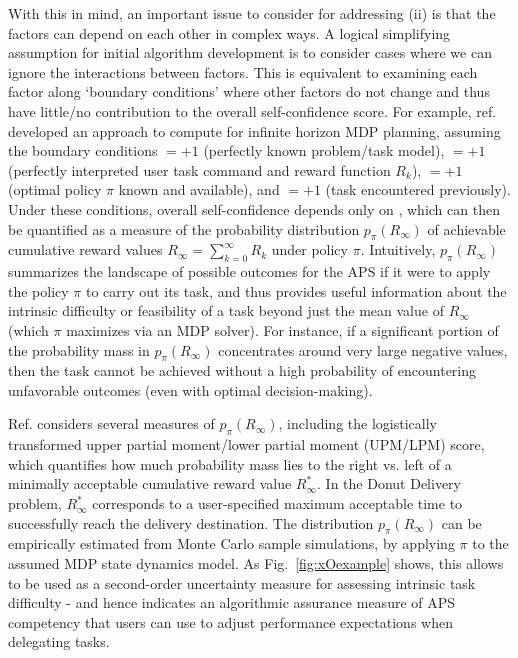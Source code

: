 With this in mind, an important issue to consider for addressing (ii) is that the factors can depend on each other in complex ways. A logical simplifying assumption for initial algorithm development is to consider cases where we can ignore the interactions between factors. This is equivalent to examining each factor along `boundary conditions' where other factors do not change and thus have little/no contribution to the overall self-confidence score. 
For example, ref. \cite{Aitken2016-cv} developed an approach to compute \xO{} for infinite horizon MDP planning, assuming the boundary conditions \xM$=+1$ (perfectly known problem/task model), \xI $= +1$ (perfectly interpreted user task command and reward function $R_k$), \xQ$=+1$ (optimal policy $\pi$ known and available), and \xP$=+1$ (task encountered previously). Under these conditions, overall self-confidence depends only on \xO{}, which can then be quantified as a measure of the probability distribution $p_{\pi}(R_{\infty})$ of achievable cumulative reward values $R_{\infty} = \sum_{k=0}^{\infty}R_{k}$ under policy $\pi$. Intuitively, $p_{\pi}(R_{\infty})$ summarizes the landscape of possible outcomes for the APS if it were to apply the policy $\pi$ to carry out its task, and thus provides useful information about the intrinsic difficulty or feasibility of a task beyond just the mean value of $R_{\infty}$ (which $\pi$ maximizes via an MDP solver). For instance, if a significant portion of the probability mass in $p_{\pi}(R_{\infty})$ concentrates around very large negative values, then the task cannot be achieved without a high probability of encountering unfavorable outcomes (even with optimal decision-making). 

Ref. \cite{Aitken2016-cv} considers several measures of $p_{\pi}(R_{\infty})$, including the logistically transformed upper partial moment/lower partial moment (UPM/LPM) score, which quantifies how much probability mass lies to the right vs. left of a minimally acceptable cumulative reward value $R^*_{\infty}$. In the Donut Delivery problem, $R^*_{\infty}$ corresponds to a user-specified maximum acceptable time to successfully reach the delivery destination. The distribution $p_{\pi}(R_{\infty})$ can be empirically estimated from Monte Carlo sample simulations, by applying $\pi$ to the assumed MDP state dynamics model. 
As  Fig.~\ref{fig:xOexample} shows, this allows \xO{} to be used as a second-order uncertainty measure for assessing intrinsic task difficulty - and hence indicates an algorithmic assurance measure of APS competency that users can use to adjust performance expectations when delegating tasks. 

